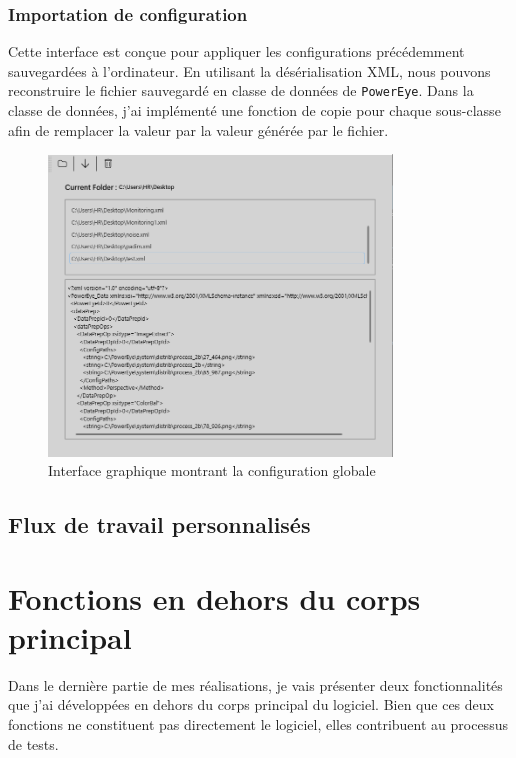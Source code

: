 \subsubsection{Importation de configuration}
Cette interface est conçue pour appliquer les configurations précédemment sauvegardées à l'ordinateur. En utilisant la désérialisation \gls{XML}, nous pouvons reconstruire le fichier sauvegardé en classe de données de \texttt{PowerEye}. Dans la classe de données, j'ai implémenté une fonction de copie pour chaque sous-classe afin de remplacer la valeur par la valeur générée par le fichier. 


\begin{figure}[H]
    \centering
    \includegraphics[height=8cm]{ressources/images/configuration_files.png}
    \caption{Interface graphique montrant la configuration globale}
\end{figure}









\subsection{Flux de travail personnalisés}
\section{Fonctions en dehors du corps principal}
Dans le dernière partie de mes réalisations, je vais présenter deux fonctionnalités que j'ai développées en dehors du corps principal du logiciel. Bien que ces deux fonctions ne constituent pas directement le logiciel, elles contribuent au processus de tests.
